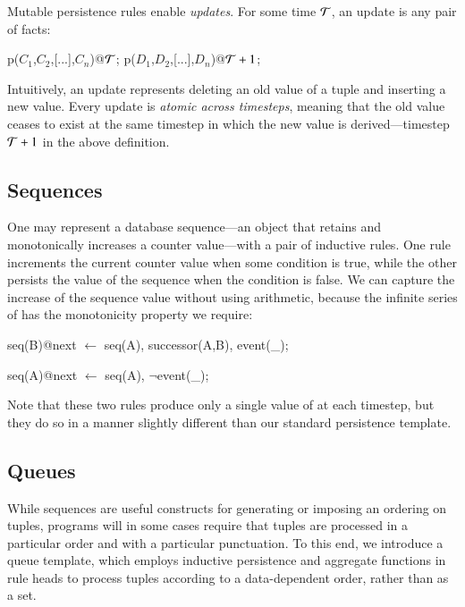 Mutable persistence rules enable {\em updates}.  For some time $\Tau$, an
update is any pair of facts:

\begin{Dedalus}
p\nega(\(C_1\),\(C_2\),[...],\(C_n\))@\(\Tau\);
p\pos(\(D_1\),\(D_2\),[...],\(D_n\))@\(\Tau+1\);
\end{Dedalus}
\noindent
Intuitively, an update represents deleting an old value of a tuple and
inserting a new value.  Every update is {\em atomic across timesteps}, meaning
that the old value ceases to exist at the same timestep in which the new value
is derived---timestep $\Tau+1$ in the above definition.


\subsection{Sequences}
One may represent a database sequence---an object that retains and monotonically increases a counter value---with a pair of inductive rules.  One rule increments the current counter value when some condition is 
true, while the other persists the value of the sequence when the condition is false.  We can capture the increase
of the sequence value without using arithmetic, because the infinite series of  has the monotonicity
property we require:

\begin{Dedalus}
seq(B)@next \(\leftarrow\) seq(A), successor(A,B), event(_);
  
seq(A)@next \(\leftarrow\) seq(A), \(\lnot\)event(_);
\end{Dedalus}

\noindent
Note that these two rules produce only a single value of  at each timestep, but they do so in a manner slightly different than our standard persistence template.

\subsection{Queues}

While sequences are useful constructs for generating or imposing an ordering on tuples, programs will in some cases require that tuples
are processed in a particular order and with a particular punctuation.   To this end, we introduce a queue template, which employs 
inductive persistence and aggregate functions in rule heads to process tuples according to a data-dependent order, rather than as a set.

